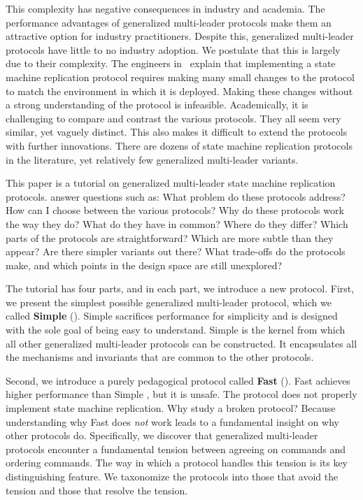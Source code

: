 This complexity has negative consequences in industry and academia. The
performance advantages of generalized multi-leader protocols make them an
attractive option for industry practitioners. Despite this, generalized
multi-leader protocols have little to no industry adoption.  We postulate that
this is largely due to their complexity. The engineers
in~\cite{chandra2007paxos} explain that implementing a state machine
replication protocol requires making many small changes to the protocol to
match the environment in which it is deployed. Making these changes without a
strong understanding of the protocol is infeasible. Academically, it is
challenging to compare and contrast the various protocols. They all seem very
similar, yet vaguely distinct. This also makes it difficult to extend the
protocols with further innovations. There are dozens of state machine
replication protocols in the literature, yet relatively few generalized
multi-leader variants.

%
This paper is a tutorial on generalized multi-leader state machine replication
protocols.  answer questions such as: What
problem do these protocols address? How can I choose between the various
protocols? Why do these protocols work the way they do? What do they have in
common? Where do they differ? Which parts of the protocols are straightforward?
Which are more subtle than they appear? Are there simpler variants out there?
What trade-offs do the protocols make, and which points in the design space are
still unexplored?

The tutorial has four parts, and in each part, we introduce a new protocol.
First, we present the simplest possible generalized multi-leader protocol,
which we called \textbf{Simple \BPaxos{}} (). Simple
\BPaxos{} sacrifices performance for simplicity and is designed with the sole
goal of being easy to understand.  Simple \BPaxos{} is the kernel from which
all other generalized multi-leader protocols can be constructed. It
encapsulates all the mechanisms and invariants that are common to the other
protocols.

Second, we introduce a purely pedagogical protocol called \textbf{Fast
\BPaxos{}} (). Fast \BPaxos{} achieves higher performance
than Simple \BPaxos{}, but it is unsafe. The protocol does not properly
implement state machine replication. Why study a broken protocol? Because
understanding why Fast \BPaxos{} does \emph{not} work leads to a fundamental
insight on why other protocols do. Specifically, we discover that generalized
multi-leader protocols encounter a fundamental tension between agreeing on
commands and ordering commands. The way in which a protocol handles this
tension is its key distinguishing feature. We taxonomize the protocols into
those that avoid the tension and those that resolve the tension.

